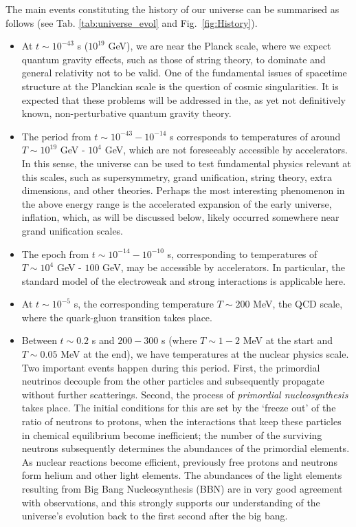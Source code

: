 The  main events constituting the history of our universe can be summarised as follows  (see Tab. \ref{tab:universe_evol} and Fig.~\ref{fig:History}).
\begin{itemize}
\item At  $t\sim 10^{-43}$ s ($10^{19}$ GeV), we are near the Planck scale, where we expect  quantum gravity effects, such as those of string theory,
to dominate and general relativity not to be valid.  One of the fundamental issues of spacetime structure at the Planckian scale is  the question of cosmic singularities.  It is expected that these problems will be  addressed in the, as yet not definitively known, non-perturbative quantum gravity theory.

\item The period from  $t\sim 10^{-43}-10^{-14}$ s corresponds to temperatures  of around $T \sim10^{19}$ GeV - $10^4$ GeV, which are not foreseeably accessible by accelerators. In this sense, the universe can be used to test fundamental physics relevant at this scales, such as supersymmetry,  grand unification, string theory, extra dimensions, and other theories. Perhaps the most interesting phenomenon in the above energy range is the accelerated expansion of the early universe, inflation, which, as will be discussed below, likely occurred  somewhere near grand unification scales.

\item The epoch from  $t\sim 10^{-14}-10^{-10}$ s, corresponding to temperatures of $T\sim 10^4$ GeV - $100$ GeV, may be accessible by accelerators.
In particular, the standard model of the electroweak and strong interactions  is applicable here.

\item At  $t\sim 10^{-5}$ s, the corresponding temperature $T\sim200$ MeV, the QCD scale, where the  quark-gluon transition takes place.

\item Between  $t\sim0.2$ s and $200-300$ s (where $T\sim 1-2$ MeV at the start and $T\sim0.05$ MeV at the end), we have temperatures at the nuclear physics scale. Two important events happen during this period. First, the primordial neutrinos decouple from the other particles and subsequently propagate without further scatterings. Second, the process of {\em primordial nucleosynthesis}  takes place.  The initial conditions for this are set by the `freeze out' of the ratio of neutrons to protons, when the interactions that keep these particles in chemical equilibrium become inefficient; the number of the surviving neutrons subsequently determines the abundances of the primordial elements. As nuclear reactions become efficient, previously free protons and neutrons form helium and other light elements. The abundances of the light elements resulting from Big Bang Nucleosynthesis (BBN) are in very good agreement with observations, and this strongly supports our understanding of the universe's evolution back to the first second after the big bang.
 

\end{itemize}
